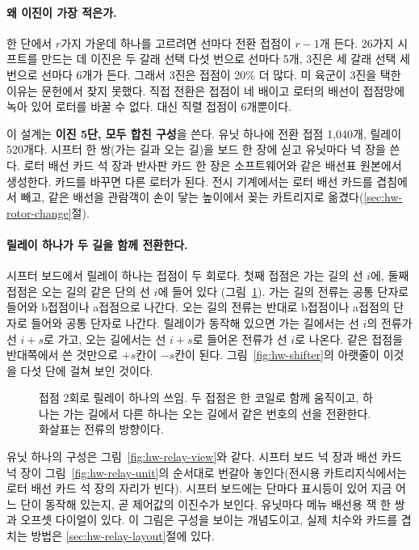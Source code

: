 \paragraph{왜 이진이 가장 적은가.} 한 단에서 $r$가지 가운데 하나를 고르려면 선마다 전환 접점이 $r-1$개 든다.
26가지 시프트를 만드는 데 이진은 두 갈래 선택 다섯 번으로 선마다 5개, 3진은 세 갈래 선택 세 번으로 선마다
6개가 든다. 그래서 3진은 접점이 20\% 더 많다. 미 육군이 3진을 택한 이유는 문헌에서 찾지 못했다. 직접 전환은
접점이 네 배이고 로터의 배선이 접점망에 녹아 있어 로터를 바꿀 수 없다. 대신 직렬 접점이 6개뿐이다.

이 설계는 \textbf{이진 5단, 모두 합친 구성}을 쓴다. 유닛 하나에 전환 접점 1,040개, 릴레이 520개다. 시프터 한
쌍(가는 길과 오는 길)을 보드 한 장에 싣고 유닛마다 넉 장을 쓴다. 로터 배선 카드 석 장과 반사판 카드 한 장은
소프트웨어와 같은 배선표 원본에서 생성한다. 카드를 바꾸면 다른 로터가 된다. 전시 기계에서는 로터 배선 카드를
겹침에서 빼고, 같은 배선을 관람객이 손이 닿는 높이에서 꽂는 카트리지로 옮겼다(\ref{sec:hw-rotor-change}절).

\paragraph{릴레이 하나가 두 길을 함께 전환한다.} 시프터 보드에서 릴레이 하나는 접점이 두 회로다. 첫째
접점은 가는 길의 선 $i$에, 둘째 접점은 오는 길의 같은 단의 선 $i$에 들어 있다
(그림~\ref{fig:hw-dpdt}). 가는 길의 전류는 공통 단자로 들어와 b접점이나 a접점으로 나간다. 오는 길의 전류는
반대로 b접점이나 a접점의 단자로 들어와 공통 단자로 나간다. 릴레이가 동작해 있으면 가는 길에서는 선 $i$의
전류가 선 $i+s$로 가고, 오는 길에서는 선 $i+s$로 들어온 전류가 선 $i$로 나온다. 같은 접점을 반대쪽에서 쓴
것만으로 $+s$칸이 $-s$칸이 된다. 그림~\ref{fig:hw-shifter}의 아랫줄이 이것을 다섯 단에 걸쳐 보인 것이다.

\begin{figure}[ht]
\centering

\caption{접점 2회로 릴레이 하나의 쓰임. 두 접점은 한 코일로 함께 움직이고, 하나는 가는 길에서 다른 하나는
오는 길에서 같은 번호의 선을 전환한다. 화살표는 전류의 방향이다.}
\label{fig:hw-dpdt}
\end{figure}

유닛 하나의 구성은 그림~\ref{fig:hw-relay-view}와 같다. 시프터 보드 넉 장과 배선 카드 넉 장이
그림~\ref{fig:hw-relay-unit}의 순서대로 번갈아 놓인다(전시용 카트리지식에서는 로터 배선 카드 석 장의 자리가 빈다).
시프터 보드에는 단마다 표시등이 있어 지금 어느
단이 동작해 있는지, 곧 제어값의 이진수가 보인다. 유닛마다 메뉴 배선용 잭 한 쌍과 오프셋 다이얼이 있다. 이
그림은 구성을 보이는 개념도이고, 실제 치수와 카드를 겹치는 방법은 \ref{sec:hw-relay-layout}절에 있다.

